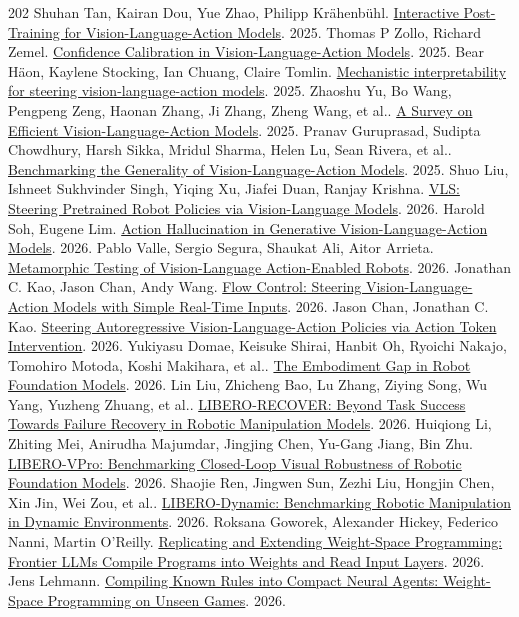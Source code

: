 \begin{thebibliography}{202}
 Shuhan Tan, Kairan Dou, Yue Zhao, Philipp Krähenbühl. \href{https://arxiv.org/abs/2505.17016v1}{Interactive Post-Training for Vision-Language-Action Models}. 2025.
 Thomas P Zollo, Richard Zemel. \href{https://arxiv.org/abs/2507.17383v3}{Confidence Calibration in Vision-Language-Action Models}. 2025.
 Bear Häon, Kaylene Stocking, Ian Chuang, Claire Tomlin. \href{https://arxiv.org/abs/2509.00328v1}{Mechanistic interpretability for steering vision-language-action models}. 2025.
 Zhaoshu Yu, Bo Wang, Pengpeng Zeng, Haonan Zhang, Ji Zhang, Zheng Wang, et al.. \href{https://arxiv.org/abs/2510.24795v3}{A Survey on Efficient Vision-Language-Action Models}. 2025.
 Pranav Guruprasad, Sudipta Chowdhury, Harsh Sikka, Mridul Sharma, Helen Lu, Sean Rivera, et al.. \href{https://arxiv.org/abs/2512.11315v1}{Benchmarking the Generality of Vision-Language-Action Models}. 2025.
 Shuo Liu, Ishneet Sukhvinder Singh, Yiqing Xu, Jiafei Duan, Ranjay Krishna. \href{https://arxiv.org/abs/2602.03973}{VLS: Steering Pretrained Robot Policies via Vision-Language Models}. 2026.
 Harold Soh, Eugene Lim. \href{https://arxiv.org/abs/2602.06339v2}{Action Hallucination in Generative Vision-Language-Action Models}. 2026.
 Pablo Valle, Sergio Segura, Shaukat Ali, Aitor Arrieta. \href{https://arxiv.org/abs/2602.22579v2}{Metamorphic Testing of Vision-Language Action-Enabled Robots}. 2026.
 Jonathan C. Kao, Jason Chan, Andy Wang. \href{https://arxiv.org/abs/2606.10180}{Flow Control: Steering Vision-Language-Action Models with Simple Real-Time Inputs}. 2026.
 Jason Chan, Jonathan C. Kao. \href{https://arxiv.org/abs/2606.15021}{Steering Autoregressive Vision-Language-Action Policies via Action Token Intervention}. 2026.
 Yukiyasu Domae, Keisuke Shirai, Hanbit Oh, Ryoichi Nakajo, Tomohiro Motoda, Koshi Makihara, et al.. \href{https://arxiv.org/abs/2608.18433v1}{The Embodiment Gap in Robot Foundation Models}. 2026.
 Lin Liu, Zhicheng Bao, Lu Zhang, Ziying Song, Wu Yang, Yuzheng Zhuang, et al.. \href{https://arxiv.org/abs/2609.05178v4}{LIBERO-RECOVER: Beyond Task Success Towards Failure Recovery in Robotic Manipulation Models}. 2026.
 Huiqiong Li, Zhiting Mei, Anirudha Majumdar, Jingjing Chen, Yu-Gang Jiang, Bin Zhu. \href{https://arxiv.org/abs/2609.24350v1}{LIBERO-VPro: Benchmarking Closed-Loop Visual Robustness of Robotic Foundation Models}. 2026.
 Shaojie Ren, Jingwen Sun, Zezhi Liu, Hongjin Chen, Xin Jin, Wei Zou, et al.. \href{https://arxiv.org/abs/2610.24579v1}{LIBERO-Dynamic: Benchmarking Robotic Manipulation in Dynamic Environments}. 2026.
 Roksana Goworek, Alexander Hickey, Federico Nanni, Martin O’Reilly. \href{https://arxiv.org/abs/2611.21449v1}{Replicating and Extending Weight-Space Programming: Frontier LLMs Compile Programs into Weights and Read Input Layers}. 2026.
 Jens Lehmann. \href{https://arxiv.org/abs/2611.16981v1}{Compiling Known Rules into Compact Neural Agents: Weight-Space Programming on Unseen Games}. 2026.
\end{thebibliography}